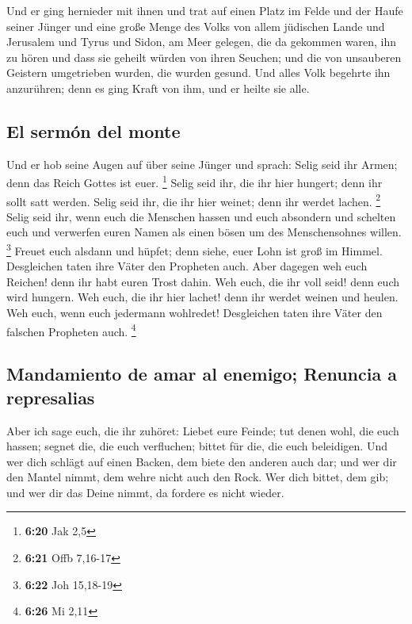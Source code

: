  Und er ging hernieder mit ihnen und trat auf einen Platz
im Felde und der Haufe seiner Jünger und eine große Menge des Volks von
allem jüdischen Lande und Jerusalem und Tyrus und Sidon, am Meer
gelegen,  die da gekommen waren, ihn zu hören und dass
sie geheilt würden von ihren Seuchen; und die von unsauberen Geistern
umgetrieben wurden, die wurden gesund.  Und alles Volk
begehrte ihn anzurühren; denn es ging Kraft von ihm, und er heilte sie
alle.

\hypertarget{el-sermuxf3n-del-monte}{%
\subsection{El sermón del monte}\label{el-sermuxf3n-del-monte}}

 Und er hob seine Augen auf über seine Jünger und sprach:
Selig seid ihr Armen; denn das Reich Gottes ist euer. \footnote{\textbf{6:20}
  Jak 2,5}  Selig seid ihr, die ihr hier hungert; denn
ihr sollt satt werden. Selig seid ihr, die ihr hier weinet; denn ihr
werdet lachen. \footnote{\textbf{6:21} Offb 7,16-17} 
Selig seid ihr, wenn euch die Menschen hassen und euch absondern und
schelten euch und verwerfen euren Namen als einen bösen um des
Menschensohnes willen. \footnote{\textbf{6:22} Joh 15,18-19}
 Freuet euch alsdann und hüpfet; denn siehe, euer Lohn
ist groß im Himmel. Desgleichen taten ihre Väter den Propheten auch.
 Aber dagegen weh euch Reichen! denn ihr habt euren Trost
dahin.  Weh euch, die ihr voll seid! denn euch wird
hungern. Weh euch, die ihr hier lachet! denn ihr werdet weinen und
heulen.  Weh euch, wenn euch jedermann wohlredet!
Desgleichen taten ihre Väter den falschen Propheten auch. \footnote{\textbf{6:26}
  Mi 2,11}

\hypertarget{mandamiento-de-amar-al-enemigo-renuncia-a-represalias}{%
\subsection{Mandamiento de amar al enemigo; Renuncia a
represalias}\label{mandamiento-de-amar-al-enemigo-renuncia-a-represalias}}

 Aber ich sage euch, die ihr zuhöret: Liebet eure Feinde;
tut denen wohl, die euch hassen;  segnet die, die euch
verfluchen; bittet für die, die euch beleidigen.  Und wer
dich schlägt auf einen Backen, dem biete den anderen auch dar; und wer
dir den Mantel nimmt, dem wehre nicht auch den Rock.  Wer
dich bittet, dem gib; und wer dir das Deine nimmt, da fordere es nicht
wieder.

